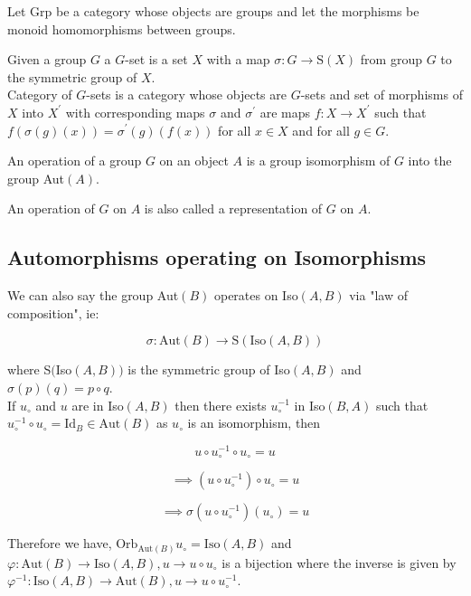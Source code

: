 \documentclass[11pt,a4paper]{colorart}
\def\oo{\circ}
\def\ra{\rightarrow}
\begin{document}
\begin{example}
	Let Grp be a category whose objects are groups and let the morphisms be monoid homomorphisms between groups.
\end{example}

\begin{example}[$G$-sets]
	Given a group $G$ a $G$-set is a set $X$ with a map $\sigma : G \ra \text{S}(X)$ from group $G$ to the symmetric group of $X$. \\
	Category of $G$-sets is a category whose objects are $G$-sets and set of morphisms of $X$ into $X^\prime$ with corresponding maps $\sigma$ and $\sigma^\prime$ are maps $f : X \ra X^\prime$ such that $f(\sigma(g)(x)) = \sigma^\prime(g)(f(x))$ for all $x \in X$ and for all $g \in G$.
\end{example}

\begin{definition}[Operation]
	An operation of a group $G$ on an object $A$ is a group isomorphism of $G$ into the group Aut$(A)$.
\end{definition}

An operation of $G$ on $A$ is also called a representation of $G$ on $A$. \\

\subsection{Automorphisms operating on Isomorphisms}

We can also say  the group Aut$(B)$ operates on Iso$(A,B)$ via "law of composition", ie:

\[ \sigma: \text{Aut}(B) \ra \text{S}(\text{Iso}(A,B)) \]

where S$($Iso$(A,B))$ is the symmetric group of Iso$(A,B)$ and $\sigma(p)(q) = p \oo q$.\\

If $u_\oo$ and $u$ are in Iso$(A,B)$ then there exists $u^{-1}_\oo$ in Iso$(B,A)$ such that $u^{-1}_\oo \oo u_\oo = \text{Id}_B \in \text{Aut}(B)$ as $u_\oo$ is an isomorphism, then 

\[  u \oo u^{-1}_\oo \oo u_\oo = u \]

\[ \implies ( u \oo u^{-1}_\oo ) \oo u_\oo = u \]

\[ \implies \sigma ( u \oo u^{-1}_\oo ) ( u_\oo ) = u \]

Therefore we have, $\text{Orb}_{\text{Aut}(B)} u_\oo = \text{Iso}(A,B)$ and $\varphi: \text{Aut}(B) \ra \text{Iso}(A,B), u \ra u \oo u_\oo$ is a bijection where the inverse is given by $\varphi^{-1}: \text{Iso}(A,B) \ra \text{Aut}(B), u \ra u \oo u^{-1}_\oo$.\\
\end{document}

